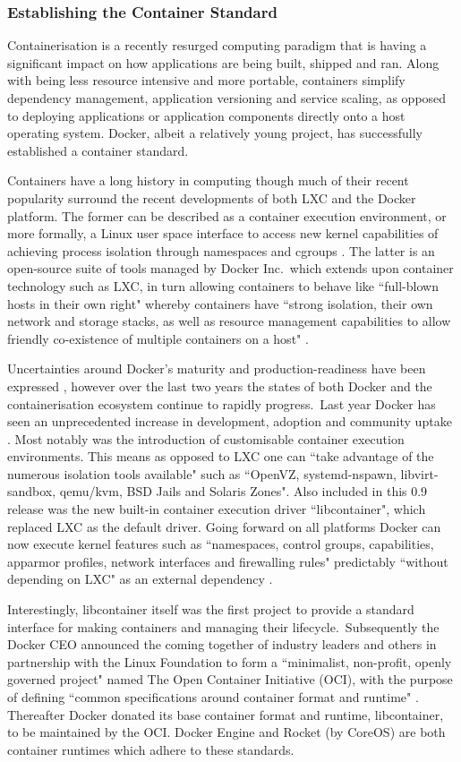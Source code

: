 \documentclass{report}
\begin{document}
\subsubsection{Establishing the Container Standard}
Containerisation is a recently resurged computing paradigm that is
having a significant impact on how applications are being built,
shipped and ran. Along with being less resource intensive and
more portable, containers simplify dependency management, application
versioning and service scaling, as opposed to deploying
applications or application components directly onto a host operating
system. Docker, albeit a relatively young project, has successfully
established a container standard.
\par
Containers have a long history in computing though much of their recent popularity 
surround the recent developments of both LXC and the Docker platform. 
The former can be described as a container execution environment,
or more formally, a Linux user space interface to 
access new kernel capabilities of achieving process isolation through namespaces
and cgroups \citep{Claus}. The latter is an open-source suite of tools managed by Docker Inc.\ which
extends upon container technology such as LXC, in turn 
allowing containers to behave like ``full-blown hosts in their own right" 
whereby containers have ``strong isolation, their own network and storage stacks, as well 
as resource management capabilities to allow friendly co-existence of multiple containers on a host" \citep{db}.
\par 
Uncertainties around Docker's maturity and production-readiness have been expressed \citep{Kereki, Powers, Merkel}, however 
over the last two years the states of both Docker and the containerisation ecosystem continue to rapidly progress.\
Last year Docker has seen an unprecedented increase in development, adoption and community uptake \citep{Merkel}. Most
notably was the introduction of customisable container execution environments. This means as opposed to LXC one can
``take advantage of the numerous isolation tools available" such as ``OpenVZ, systemd-nspawn, libvirt-sandbox, qemu/kvm, BSD Jails and Solaris Zones".
Also included in this 0.9 release was the new built-in container execution driver ``libcontainer", which replaced LXC as the default driver.
Going forward on all platforms Docker can now execute kernel features such as ``namespaces, control groups, capabilities, apparmor profiles, 
network interfaces and firewalling rules" predictably ``without depending on LXC" as an external dependency \citep{Hykes}. 
\par
Interestingly, libcontainer itself was the first project to provide a standard interface for making containers and managing their lifecycle.\
Subsequently the Docker CEO  announced the coming together of industry leaders and others in partnership with the Linux Foundation
to form a ``minimalist, non-profit, openly governed project" named The Open Container Initiative (OCI), with the purpose of defining 
``common specifications around container format and runtime" \citep{Golub}. 
Thereafter Docker donated its base container format and runtime, libcontainer, to be maintained by the OCI. Docker Engine and Rocket (by CoreOS) are both
container runtimes which adhere to these standards. 
\end{document}
